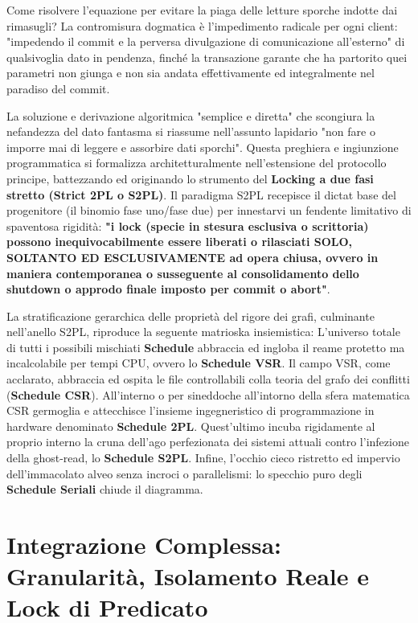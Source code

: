 Come risolvere l'equazione per evitare la piaga delle letture sporche indotte dai rimasugli? La contromisura dogmatica è l'impedimento radicale per ogni client: "impedendo il commit e la perversa divulgazione di comunicazione all'esterno" di qualsivoglia dato in pendenza, finché la transazione garante che ha partorito quei parametri non giunga e non sia andata effettivamente ed integralmente nel paradiso del commit.

La soluzione e derivazione algoritmica "semplice e diretta" che scongiura la nefandezza del dato fantasma si riassume nell'assunto lapidario "non fare o imporre mai di leggere e assorbire dati sporchi". Questa preghiera e ingiunzione programmatica si formalizza architetturalmente nell'estensione del protocollo principe, battezzando ed originando lo strumento del \textbf{Locking a due fasi stretto (Strict 2PL o S2PL)}.
Il paradigma S2PL recepisce il dictat base del progenitore (il binomio fase uno/fase due) per innestarvi un fendente limitativo di spaventosa rigidità: \textbf{"i lock (specie in stesura esclusiva o scrittoria) possono inequivocabilmente essere liberati o rilasciati SOLO, SOLTANTO ED ESCLUSIVAMENTE ad opera chiusa, ovvero in maniera contemporanea o susseguente al consolidamento dello shutdown o approdo finale imposto per commit o abort"}.

La stratificazione gerarchica delle proprietà del rigore dei grafi, culminante nell'anello S2PL, riproduce la seguente matrioska insiemistica:
L'universo totale di tutti i possibili mischiati \textbf{Schedule} abbraccia ed ingloba il reame protetto ma incalcolabile per tempi CPU, ovvero lo \textbf{Schedule VSR}. Il campo VSR, come acclarato, abbraccia ed ospita le file controllabili colla teoria del grafo dei conflitti (\textbf{Schedule CSR}). All'interno o per sineddoche all'intorno della sfera matematica CSR germoglia e attecchisce l'insieme ingegneristico di programmazione in hardware denominato \textbf{Schedule 2PL}. Quest'ultimo incuba rigidamente al proprio interno la cruna dell'ago perfezionata dei sistemi attuali contro l'infezione della ghost-read, lo \textbf{Schedule S2PL}. Infine, l'occhio cieco ristretto ed impervio dell'immacolato alveo senza incroci o parallelismi: lo specchio puro degli \textbf{Schedule Seriali} chiude il diagramma.

\section{Integrazione Complessa: Granularità, Isolamento Reale e Lock di Predicato}

